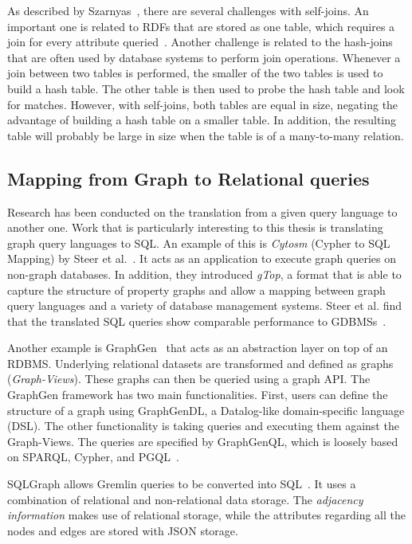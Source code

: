 As described by Szarnyas~\cite{self-joins}, there are several challenges with self-joins. An important one is related to RDFs that are stored as one table, which requires a join for every attribute queried~\cite{DBLP:journals/pvldb/Ozsu19}.
Another challenge is related to the hash-joins that are often used by database systems to perform join operations. 
Whenever a join between two tables is performed, the smaller of the two tables is used to build a hash table. 
The other table is then used to probe the hash table and look for matches. 
However, with self-joins, both tables are equal in size, negating the advantage of building a hash table on a smaller table. 
In addition, the resulting table will probably be large in size when the table is of a many-to-many relation. 

\subsection{Mapping from Graph to Relational queries}
Research has been conducted on the translation from a given query language to another one. Work that is particularly interesting to this thesis is translating graph query languages to SQL. 
An example of this is \textit{Cytosm} (Cypher to SQL Mapping) by Steer et al.~\cite{DBLP:conf/grades/SteerALCVV17}. 
It acts as an application to execute graph queries on non-graph databases. 
In addition, they introduced \textit{gTop}, a format that is able to capture the structure of property graphs and allow a mapping between graph query languages and a variety of database management systems. 
Steer et al. find that the translated SQL queries show comparable performance to GDBMSs~\cite{DBLP:conf/grades/SteerALCVV17}.

Another example is GraphGen~\cite{DBLP:conf/grades/Xirogiannopoulos17} that acts as an abstraction layer on top of an RDBMS. 
Underlying relational datasets are transformed and defined as graphs (\textit{Graph-Views}). 
These graphs can then be queried using a graph API. The GraphGen framework has two main functionalities. 
First, users can define the structure of a graph using GraphGenDL, a Datalog-like domain-specific language (DSL). 
The other functionality is taking queries and executing them against the Graph-Views. The queries are specified by GraphGenQL, which is loosely based on SPARQL, Cypher, and PGQL~\cite{DBLP:conf/grades/Xirogiannopoulos17}.

SQLGraph allows Gremlin queries to be converted into SQL~\cite{DBLP:conf/sigmod/SunFSKHX15}. 
It uses a combination of relational and non-relational data storage. The \textit{adjacency information} makes use of relational storage, while the attributes regarding all the nodes and edges are stored with JSON storage.

